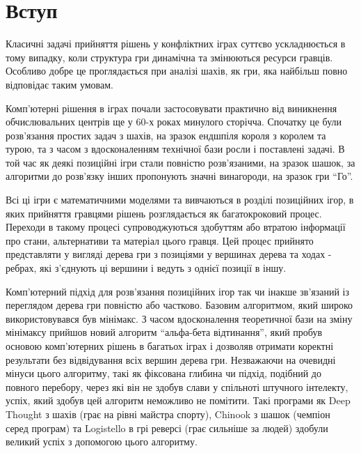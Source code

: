 \documentclass[12pt,a4paper]{article}
\begin{document}
\newcommand{\vect}[1]{(#1_1,#1_2,\dots,#1_n)}

\tableofcontents
\clearpage
{}
\setlength{\topmargin}{0cm}
\section{Вступ}

Класичні задачі прийняття рішень у конфліктних іграх суттєво ускладнюється в 
тому випадку, коли структура гри динамічна та змінюються ресурси
гравців. Особливо добре це проглядається при аналізі шахів, як гри, яка
найбільш повно відповідає таким умовам.

Комп'ютерні рішення в іграх почали застосовувати практично від виникнення
обчислювальних центрів ще у 60-х роках минулого сторічча. Спочатку це були
розв'язання простих задач з шахів, на зразок ендшпіля короля з королем та
турою, та з часом з вдосконаленням технічної бази росли і поставлені задачі. 
В той час як деякі позиційні ігри стали повністю розв'язаними, на зразок
шашок, за алгоритми до розв'язку інших пропонують значні винагороди, на зразок
гри ``Го''.

Всі ці ігри є математичними моделями та вивчаються в розділі позиційних ігор,
в яких прийняття гравцями рішень розглядається як багатокроковий
процес. Переходи в такому процесі супроводжуються здобуттям або втратою
інформації про стани, альтернативи та матеріал цього гравця. Цей процес
прийнято представляти у вигляді дерева гри з позиціями у вершинах дерева та
ходах - ребрах, які з'єднують ці вершини і ведуть з однієї позиції в іншу.

Комп'ютерний підхід для розв'язання позиційних ігор так чи інакше зв'язаний із
переглядом дерева гри повністю або частково. Базовим алгоритмом, який
широко використовувався був мінімакс. З часом вдосконалення теоретичної бази
на зміну мінімаксу прийшов новий алгоритм ``альфа-бета відтинання'', який
пробув основою комп'ютерних рішень в багатьох іграх і дозволяв отримати
коректні результати без відвідування всіх вершин дерева гри. Незважаючи на
очевидні мінуси цього алгоритму, такі як фіксована глибина чи підхід, подібний
до повного перебору, через які він не здобув слави у спільноті штучного
інтелекту, успіх, який здобув цей алгоритм неможливо не помітити. Такі
програми як Deep Thought з шахів (грає на рівні майстра спорту), Chinook з
шашок (чемпіон серед програм) та Logistello в грі реверсі (грає сильніше за
людей) здобули великий успіх з допомогою цього алгоритму.
\end{document}
